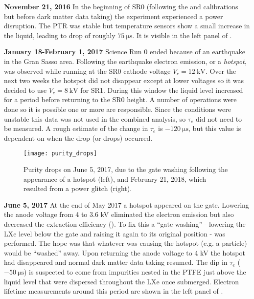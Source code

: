 \textbf{November 21, 2016}  In the beginning of SR0 (following the \ambe and \metakr calibrations but before dark matter data taking) the
experiment experienced a power disruption.  The PTR was stable but temperature sensors show a small increase in the
liquid, leading to drop of roughly $75\ \mathrm{\mu s}$.  It is visible in the left panel of
.

\textbf{January 18-February 1, 2017} Science Run 0 ended because of an earthquake in the Gran Sasso area.  Following the earthquake
electron emission, or a \textit{hotspot}, was observed while running at the SR0 cathode voltage $V_c = 12\ \mathrm{kV}$.  Over the next two
weeks the hotspot did not disappear except at lower voltages so it was decided to use $V_c = 8\ \mathrm{kV}$ for SR1.  During this window
the liquid level increased for a period before returning to the SR0 height.  A number of operations were done so it is possible one or more
are responsible.  Since the conditions were unstable this data was not used in the
combined analysis, so $\tau_e$ did not need to be measured.  A rough estimate of the change in $\tau_e$ is $-120\ \mathrm{\mu s}$, but this
value is dependent on when the drop (or drops) occurred.

\begin{figure}
\centering
\texttt{[image: purity\_drops]}
\caption{Purity drops on June 5, 2017, due to the gate washing following the appearance of a hotspot (left), and February 21, 2018, which
resulted from a power glitch (right).}
\label{fig:electron_lifetime_model_detector_effects_spikes_examples}
\end{figure}

\textbf{June 5, 2017}  At the end of May 2017 a hotspot appeared on the gate.  Lowering the anode voltage from 4 to 3.6 kV eliminated the
electron emission but also decreased the extraction efficiency ().  To fix this
a ``gate washing'' - lowering the LXe level below the gate and raising it again to its original position - was performed.  The hope was that
whatever was causing the hotspot (e.g. a particle) would be ``washed''
away.  Upon returning the anode voltage to 4 kV the hotspot had disappeared and normal dark matter data taking resumed.  The dip in
$\tau_e$ ($-50\ \mathrm{\mu s}$) is suspected to come from impurities nested in the PTFE just above the liquid level that were dispersed
throughout the LXe once submerged.  Electron lifetime measurements around this period are shown in the left panel of
.

